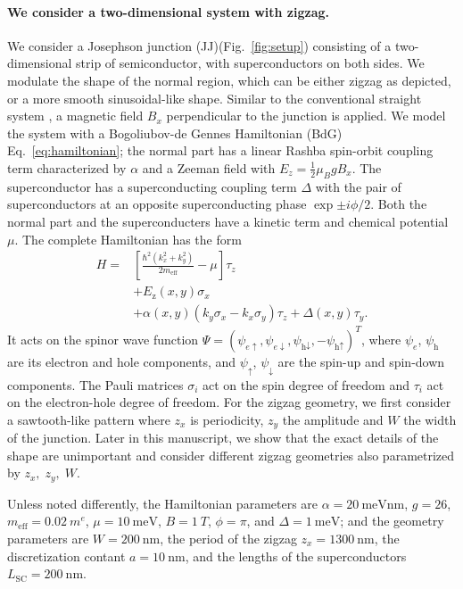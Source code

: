 \documentclass[english, twocolumn, 10pt, aps, superscriptaddress, floatfix, prb, citeautoscript]{revtex4-1}
\newcommand{\kx}{k_x}
\newcommand{\ky}{k_y}
\newcommand{\meff}{m_\text{eff}}
\renewcommand{\comment}[2]{#2}
\renewcommand{\comment}{\paragraph}
\begin{document}
\comment{We consider a two-dimensional system with zigzag.}
We consider a Josephson junction (JJ)(Fig.~\ref{fig:setup}) consisting of a two-dimensional strip of semiconductor, with superconductors on both sides.
We modulate the shape of the normal region, which can be either zigzag as depicted, or a more smooth sinusoidal-like shape.
Similar to the conventional straight system \cite{pientka2017topological}, a magnetic field $B_x$ perpendicular to the junction is applied.
We model the system with a Bogoliubov-de Gennes Hamiltonian (BdG) Eq.~\eqref{eq:hamiltonian}; the normal part has a linear Rashba spin-orbit coupling term characterized by $\alpha$ and a Zeeman field with $E_z=\frac{1}{2} \mu_B g B_x$.
The superconductor has a superconducting coupling term $\Delta$ with the pair of superconductors at an opposite superconducting phase $\exp{\pm i \phi/2}$.
Both the normal part and the superconducters have a kinetic term and chemical potential $\mu$.
The complete Hamiltonian has the form
\begin{equation}
\begin{split}
    H = & \left[\frac{\hbar^2\left(\kx^2 + \ky^2\right)}{2\meff} - \mu\right] \tau_z \\
        & + E_\text{z}(x,y) \sigma_x \\
        & + \alpha(x,y) \left( \ky \sigma_x - \kx \sigma_y \right) \tau_z
          + \Delta(x,y) \tau_y.
\end{split}
\label{eq:hamiltonian}
\end{equation}
It acts on the spinor wave function $\Psi={\left(\psi_{e\uparrow},\psi_{e\downarrow},\psi_{\textrm{h}\downarrow},-\psi_{\textrm{h}\uparrow}\right)}^{T}$, where $\psi_e$, $\psi_\textrm{h}$ are its electron and hole components, and $\psi_\uparrow$, $\psi_\downarrow$ are the spin-up and spin-down components.
The Pauli matrices $\sigma_{i}$ act on the spin degree of freedom and $\tau_{i}$ act on the electron-hole degree of freedom.
For the zigzag geometry, we first consider a sawtooth-like pattern where $z_x$ is periodicity, $z_y$ the amplitude and $W$ the width of the junction.
Later in this manuscript, we show that the exact details of the shape are unimportant and consider different zigzag geometries also parametrized by $z_x, \; z_y, \; W$.

Unless noted differently, the Hamiltonian parameters are $\alpha=\SI{20}{\meV \nm}$, $g=26$, $\meff=\SI{0.02}{\electronmass}$, $\mu=\SI{10}{\meV}$, $B=\SI{1}{T}$, $\phi=\pi$, and $\Delta=\SI{1}{\meV}$; and the geometry parameters are $W=\SI{200}{\nm}$, the period of the zigzag $z_x=\SI{1300}{\nm}$, the discretization contant $a=\SI{10}{\nm}$, and the lengths of the superconductors $L_\textrm{SC}=\SI{200}{\nm}$.
\end{document}
